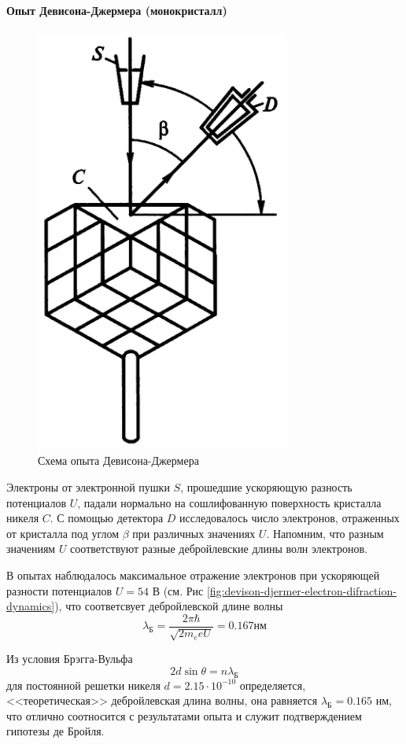 \newpage
\paragraph{Опыт Девисона-Джермера (монокристалл)}
\begin{figure}
	\centering
	\includegraphics[width=0.5\linewidth]{img/oral-05/devison-djermer}
	\caption{Схема опыта Девисона-Джермера}
	\label{fig:devison-djermer}
\end{figure}
Электроны от электронной пушки $S$, прошедшие ускоряющую разность потенциалов $U$, падали нормально на сошлифованную поверхность кристалла никеля $C$. С помощью детектора $D$ исследовалось число электронов, отраженных от кристалла под углом $\beta$ при различных значениях $U$. Напомним, что разным значениям $U$ соответствуют разные дебройлевские длины волн электронов.

В опытах наблюдалось максимальное отражение электронов при ускоряющей разности потенциалов $U=54$ В (см. Рис \ref{fig:devison-djermer-electron-difraction-dynamics}), что соответсвует дебройлевской длине волны
\begin{equation*}
	\lambda_{\text{Б}}=\frac{2\pi\hbar}{\sqrt{2m_eeU}}=0.167 \text{нм}
\end{equation*}

Из условия Брэгга-Вульфа 
\begin{equation*}
	2d\sin\theta=n\lambda_{\text{Б}}
\end{equation*}
для постоянной решетки никеля $d=2.15\cdot10^{-10}$ определяется, <<теоретическая>> дебройлевская длина волны, она равняется $\lambda_{\text{Б}}=0.165$ нм, что отлично соотносится с результатами опыта и служит подтверждением гипотезы де Бройля.

